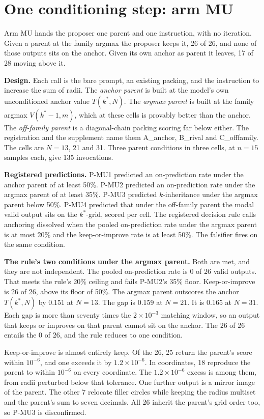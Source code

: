 \section{One conditioning step: arm MU}\label{sec:arm-mu}

Arm MU hands the proposer one parent and one instruction, with no iteration. Given a
parent at the family argmax the proposer keeps it, 26 of 26, and none of those outputs sits
on the anchor. Given its own anchor as parent it leaves, 17 of 28 moving above it.

\textbf{Design.} Each call is the bare prompt, an existing packing, and the instruction to
increase the sum of radii.
The \emph{anchor parent} is built at the model's own unconditioned anchor value $T(k^*, N)$.
The \emph{argmax parent} is built at the family argmax $V(k^*{-}1, m)$, which at these cells
is provably better than the anchor. The \emph{off-family parent} is a diagonal-chain packing
scoring far below either. The registration and the supplement name them A\_anchor, B\_rival
and C\_offfamily. The cells are $N = 13$, 21 and 31. Three parent conditions in three cells,
at $n = 15$ samples each, give 135 invocations.

\textbf{Registered predictions.} P-MU1 predicted an on-prediction rate under the anchor parent
of at least 50\%. P-MU2 predicted an on-prediction rate under the argmax parent of at least
35\%. P-MU3 predicted $k$-inheritance under the argmax parent below 50\%. P-MU4 predicted that
under the off-family parent the modal valid output sits on the $k^*$-grid, scored per cell.
The registered decision rule calls anchoring dissolved when the pooled on-prediction rate
under the argmax parent is at most 20\% and the keep-or-improve rate is at least 50\%. The
falsifier fires on the same condition.

\textbf{The rule's two conditions under the argmax parent.} Both are met, and they are not
independent. The pooled on-prediction rate is 0 of 26 valid outputs. That meets
the rule's 20\% ceiling and fails P-MU2's 35\% floor. Keep-or-improve is 26 of 26, above
its floor of 50\%. The argmax parent outscores the anchor
$T(k^*, N)$ by 0.151 at $N = 13$. The gap is 0.159 at $N = 21$. It is 0.165 at $N = 31$. Each
gap is more than seventy times the $2\times10^{-3}$ matching window, so an output that keeps or
improves on that parent cannot sit on the anchor. The 26 of 26 entails the 0 of 26,
and the rule reduces to one condition.

Keep-or-improve is almost entirely keep. Of the 26, 25 return the parent's score within
$10^{-6}$, and one exceeds it by $1.2\times10^{-6}$. In
coordinates, 18 reproduce the parent to within $10^{-6}$ on every coordinate. The
$1.2\times10^{-6}$ excess is among them, from radii perturbed below that tolerance. One
further output is a mirror image of the parent. The other 7 relocate
filler circles while keeping the radius multiset and the parent's sum to seven decimals. All
26 inherit the parent's grid order too, so P-MU3 is disconfirmed.

